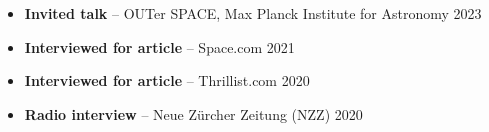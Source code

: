 \begin{itemize}
    \item \textbf{Invited talk} -- OUTer SPACE, Max Planck Institute for Astronomy \hfill 2023
    \item \textbf{Interviewed for article} -- Space.com \hfill 2021
    \item \textbf{Interviewed for article} -- Thrillist.com \hfill 2020
    \item \textbf{Radio interview} -- Neue Zürcher Zeitung (NZZ) \hfill 2020
\end{itemize}